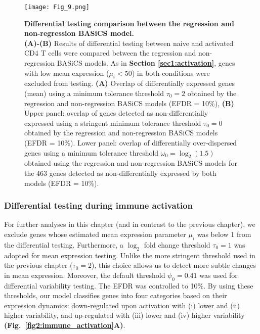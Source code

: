 \begin{figure}[!h]
\centering
\texttt{[image: Fig\_9.png]}
\caption[Differential testing results of the two BASiCS models]{\textbf{Differential testing comparison between the regression and non-regression BASiCS model.}\\
\textbf{(A)-(B)} Results of differential testing between naive and activated CD4\plus{} T cells were compared between the regression and non-regression BASiCS models. 
As in \textbf{Section \ref{sec1:activation}}, genes with low mean expression ($\mu_i<50$) in both conditions were excluded from testing. \textbf{(A)} Overlap of differentially expressed genes (mean) using a minimum tolerance threshold $\tau_0=2$ obtained by the regression and non-regression BASiCS models (EFDR = 10\%), 
\textbf{(B)} Upper panel: overlap of genes detected as non-differentially expressed using a stringent minimum tolerance threshold $\tau_0=0$ obtained by the regression and non-regression BASiCS models (EFDR = 10\%). 
Lower panel: overlap of differentially over-dispersed genes using a minimum tolerance threshold $\omega_0=\log_2(1.5)$ obtained using the regression and non-regression  BASiCS models for the 463 genes detected as non-differentially expressed by both models (EFDR = 10\%).}
\label{fig2:model_comparison}
\end{figure}

\subsubsection{Differential testing during immune activation}

For further analyses in this chapter (and in contrast to the previous chapter), we exclude genes whose estimated mean expression parameter $\mu_i$ was below 1 from the differential testing. 
Furthermore, a $\log_2$ fold change threshold $\tau_0 = 1$ was adopted for mean expression testing. 
Unlike the more stringent threshold used in the previous chapter ($\tau_0 = 2$), this choice allows us to detect more subtle changes in mean expression. 
Moreover, the default threshold $\psi_0 = 0.41$ was used for differential variability testing. 
The EFDR was controlled to 10\%. By using these thresholds, our model classifies genes into four categories based on their expression dynamics: down-regulated upon activation with (i) lower and (ii) higher variability, and up-regulated with (iii) lower and (iv) higher variability \textbf{(Fig.~\ref{fig2:immune_activation}A)}. \\

